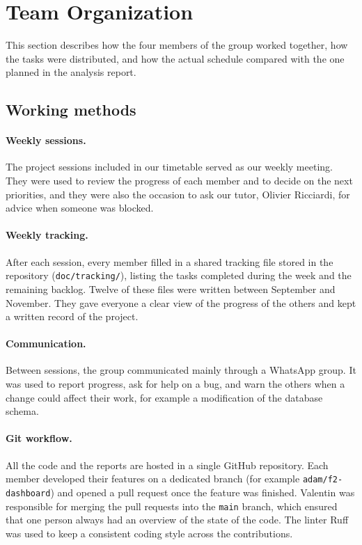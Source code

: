 \section{Team Organization}

This section describes how the four members of the group worked together, how the tasks were distributed, and how the actual schedule compared with the one planned in the analysis report.

\subsection{Working methods}

\paragraph{Weekly sessions.} The project sessions included in our timetable served as our weekly meeting. They were used to review the progress of each member and to decide on the next priorities, and they were also the occasion to ask our tutor, Olivier Ricciardi, for advice when someone was blocked.

\paragraph{Weekly tracking.} After each session, every member filled in a shared tracking file stored in the repository (\texttt{doc/tracking/}), listing the tasks completed during the week and the remaining backlog. Twelve of these files were written between September and November. They gave everyone a clear view of the progress of the others and kept a written record of the project.

\paragraph{Communication.} Between sessions, the group communicated mainly through a WhatsApp group. It was used to report progress, ask for help on a bug, and warn the others when a change could affect their work, for example a modification of the database schema.

\paragraph{Git workflow.} All the code and the reports are hosted in a single GitHub repository. Each member developed their features on a dedicated branch (for example \texttt{adam/f2-dashboard}) and opened a pull request once the feature was finished. Valentin was responsible for merging the pull requests into the \texttt{main} branch, which ensured that one person always had an overview of the state of the code. The linter Ruff was used to keep a consistent coding style across the contributions.

